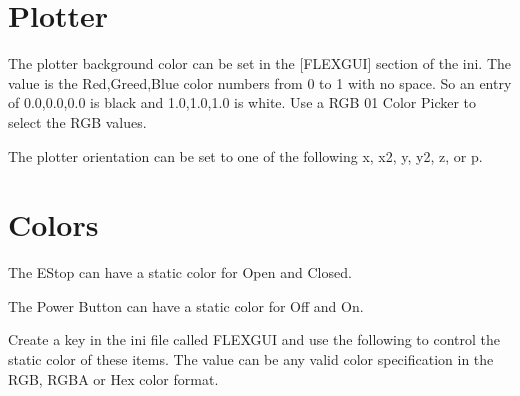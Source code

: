 \documentclass[letterpaper,10pt,english]{sphinxmanual}
\begin{document}
\section{Plotter}
\label{\detokenize{ini:plotter}}
\sphinxAtStartPar
The plotter background color can be set in the {[}FLEXGUI{]} section of the ini. The
value is the Red,Greed,Blue color numbers from 0 to 1 with no space. So an entry
of 0.0,0.0,0.0 is black and 1.0,1.0,1.0 is white. Use a RGB 0\sphinxhyphen{}1 Color Picker to
select the RGB values.

\begin{sphinxVerbatim}[commandchars=\\\{\}]
\PYG{p}{[}\PYG{p}{]}
  
\end{sphinxVerbatim}

\sphinxAtStartPar
The plotter orientation can be set to one of the following x, x2, y, y2, z, or p.

\begin{sphinxVerbatim}[commandchars=\\\{\}]
\PYG{p}{[}\PYG{p}{]}
  
\end{sphinxVerbatim}


\section{Colors}
\label{\detokenize{ini:colors}}
\sphinxAtStartPar
The E\sphinxhyphen{}Stop can have a static color for Open and Closed.

\sphinxAtStartPar
The Power Button can have a static color for Off and On.

\sphinxAtStartPar
Create a key in the ini file called FLEXGUI and use the following to
control the static color of these items. The value can be any valid color
specification in the RGB, RGBA or Hex color format.

\begin{sphinxVerbatim}[commandchars=\\\{\}]
\PYG{p}{[}\PYG{p}{]}
    
    
    
  
     
     
\end{sphinxVerbatim}
\end{document}
